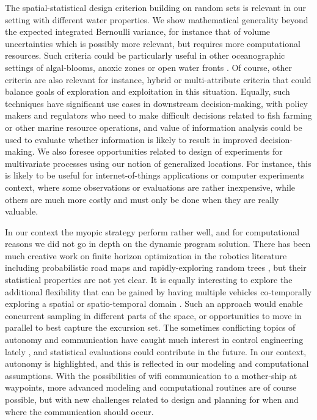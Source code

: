 \documentclass[aoas]{imsart}
\begin{document}
The spatial-statistical design criterion building on random sets is
relevant in our setting with different water properties. 
We show
mathematical generality beyond the expected integrated Bernoulli variance, for instance that of volume uncertainties which is possibly more relevant, but requires more computational resources.
Such criteria could be particularly useful in other oceanographic settings of algal-blooms, anoxic
zones or open water fronts \cite{costa19}.
Of course, other criteria
are also relevant for instance, hybrid or multi-attribute criteria
that could balance goals of exploration and exploitation in this
situation. Equally, such techniques have significant use cases in
downstream decision-making, with policy makers and regulators who need
to make difficult decisions related to fish farming or other marine
resource operations, and value of information analysis
\citep{Eidsvik:15} could be used to evaluate whether
information is likely to result in improved decision-making.
We also foresee opportunities related to design of experiments for multivariate processes using our notion of generalized locations. For instance, this is likely to be useful for internet-of-things applications or computer experiments context, where some observations or evaluations are rather inexpensive, while others are much more costly and must only be done when they are really valuable.   


In our context the myopic strategy perform rather well, and for computational reasons we did not go in depth on the dynamic program solution. There has been much creative work on finite horizon optimization in the robotics literature including probabilistic road maps and rapidly-exploring random trees \citep{karaman2011sampling}, but their statistical properties are not yet clear.
It is equally interesting to
explore the additional flexibility that can be gained by having
multiple vehicles co-temporally exploring a spatial or spatio-temporal
domain \citep{ferreira2019advancing}. Such an approach would enable
concurrent sampling in different parts of the space, or opportunities
to move in parallel to best capture the excursion set.
The sometimes conflicting topics of autonomy and communication have caught much interest in control engineering lately \citep{zolich2019survey}, and statistical evaluations could contribute in the future. In our context, autonomy is highlighted, and this is reflected in our modeling and computational assumptions. With the possibilities of wifi communication to a mother-ship at waypoints, more advanced modeling and computational routines are of course possible, but with new challenges related to design and planning for when and where the communication should occur. 
\end{document}
